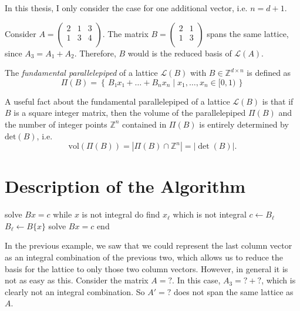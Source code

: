 In this thesis, I only consider the case for one additional vector, i.e. $n = d + 1$.

\begin{example}
  Consider $A = \begin{pmatrix}
    2 & 1 & 3 \\
    1 & 3 & 4 \\
  \end{pmatrix}$.
  The matrix $B = \begin{pmatrix}
    2 & 1 \\
    1 & 3 \\
  \end{pmatrix}$
  spans the same lattice,
  since $A_3 = A_1 + A_2$.
  Therefore, $B$ would is the reduced basis of $\mathcal L(A)$.
\end{example}


\begin{definition}
  The \emph{fundamental parallelepiped} of a lattice $\mathcal{L}(B)$ with $B ∈ ℤ^{d × n}$ is defined as
  \[
    Π(B) = \left\{\, B₁ x₁ + \dots + B_n x_n \mid x_1, \dots, x_n ∈ [0, 1) \,\right\}
  \]
\end{definition}

A useful fact about the fundamental parallelepiped of a lattice $\mathcal L(B)$
is that if $B$ is a square integer matrix, then the volume of the
parallelepiped $Π(B)$ and the number of integer points $ℤ^n$ contained in
$Π(B)$ is entirely determined by $\mathrm{det}(B)$, i.e.
\[
  \mathrm{vol}(Π(B)) = |Π(B) ∩ ℤ^n| = |\det(B)|.
\]

\section{Description of the Algorithm}

\begin{Pseudocode}[float=tb,caption={The Generalized Euclidean Algorithm \cite{Klein24}.}]
solve $Bx = c$
while $x$ is not integral do
  find $x_ℓ$ which is not integral
  $c ← B_ℓ$
  $B_ℓ ← B\{x\}$
  solve $Bx = c$
end
\end{Pseudocode}

In the previous example,
we saw that we could represent the last column vector as an integral
combination of the previous two,
which allows us to reduce the basis for the lattice to only those two column vectors.
However, in general it is not as easy as this.
Consider the matrix $A = ?$.
In this case, $A_3 = ? + ?$, which is clearly not an integral combination.
So $A' = ?$ does not span the same lattice as $A$.

